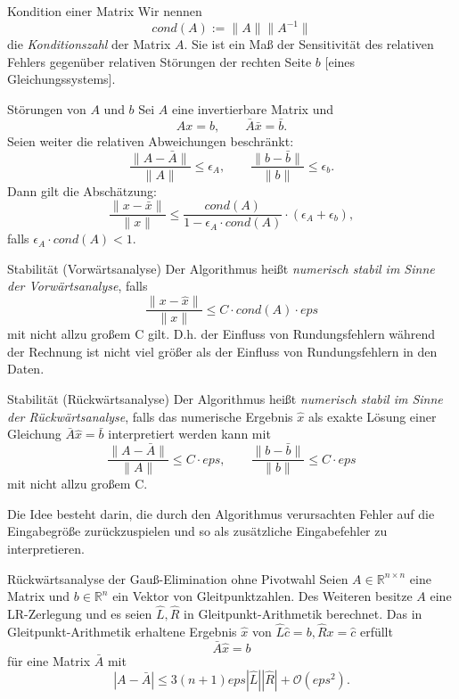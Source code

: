 \begin{flashcard}[Definition]{Kondition einer Matrix}
	Wir nennen
	$$ cond(A) := \| A \| \|A^{-1}\| $$
	die \emph{Konditionszahl} der Matrix $A$.
	Sie ist ein Maß der Sensitivität des relativen Fehlers gegenüber relativen Störungen der rechten Seite $b$ [eines Gleichungssystems].
\end{flashcard}

\begin{flashcard}[Satz]{Störungen von $A$ und $b$}
	Sei $A$ eine invertierbare Matrix und
	$$ Ax = b, \qquad \bar{A}\bar{x}=\bar{b}.$$
	Seien weiter die relativen Abweichungen beschränkt:
	$$ \frac{\|A - \bar{A}\|}{\|A\|} \leq \epsilon_A, \qquad \frac{\|b - \bar{b}\|}{\|b\|} \leq \epsilon_b.$$
	Dann gilt die Abschätzung:
	$$ \frac{\|x - \bar{x}\|}{\|x\|} \leq \frac{cond(A)}{1 - \epsilon_A \cdot cond(A)} \cdot (\epsilon_A + \epsilon_b),$$
	falls $\epsilon_A \cdot cond(A) < 1$.
\end{flashcard}

\begin{flashcard}[Definition]{Stabilität (Vorwärtsanalyse)}
	Der Algorithmus heißt \emph{numerisch stabil im Sinne der Vorwärtsanalyse}, falls
	$$ \frac{\|x - \hat{x}\|}{\|x\|} \leq C \cdot cond(A) \cdot eps$$
	mit nicht allzu großem C gilt.
	D.h. der Einfluss von Rundungsfehlern während der Rechnung ist nicht viel größer als der Einfluss von Rundungsfehlern in den Daten.
\end{flashcard}

\begin{flashcard}[Definition]{Stabilität (Rückwärtsanalyse)}
	Der Algorithmus heißt \emph{numerisch stabil im Sinne der Rückwärtsanalyse}, falls das numerische Ergebnis $\hat{x}$ als exakte Lösung einer Gleichung $\bar{A}\hat{x} = \bar{b}$ interpretiert werden kann mit
	$$ \frac{\|A - \bar{A}\|}{\|A\|} \leq C \cdot eps, \qquad \frac{\|b - \bar{b}\|}{\|b\|} \leq C \cdot eps$$
	mit nicht allzu großem C.

	Die Idee besteht darin, die durch den Algorithmus verursachten Fehler auf die Eingabegröße zurückzuspielen und so als zusätzliche Eingabefehler zu interpretieren.
\end{flashcard}

\begin{flashcard}[Satz]{Rückwärtsanalyse der Gauß-Elimination ohne Pivotwahl}
	Seien $A \in \mathbb{R}^{n \times n}$ eine Matrix und $b \in \mathbb{R}^n$ ein Vektor von Gleitpunktzahlen.
	Des Weiteren besitze $A$ eine LR-Zerlegung und es seien $\hat{L}, \hat{R}$ in Gleitpunkt-Arithmetik berechnet.
	Das in Gleitpunkt-Arithmetik erhaltene Ergebnis $\hat{x}$ von $\hat{L}\hat{c} = b, \hat{R}x = \hat{c}$ erfüllt
	$$ \bar{A}\hat{x} = b $$
	für eine Matrix $\bar{A}$ mit
	$$ |A - \bar{A}| \leq 3 (n + 1) eps |\hat{L}| |\hat{R}| + \mathcal{O}(eps^2).$$
\end{flashcard}

